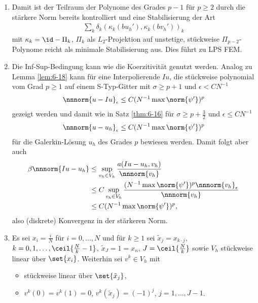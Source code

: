 \begin{bemerkung*}
  \begin{enumerate}
  \item Damit ist der Teilraum der Polynome des Grades $p-1$ für $p \geq 2$ durch die stärkere Norm bereits kontrolliert und eine Stabilisierung der Art
    \begin{align*}
      \sum_{k} \delta_{k} (\kappa_{k}(b u_{h}'), \kappa_{k}(b v_{h}'))_{k}
    \end{align*}
    mit $\kappa_{k} = \id - \Pi_{k}$, $\Pi_{k}$ als $L_{2}$-Projektion auf unstetige, stückweise $\Pi_{p-2}$-Polynome reicht als minimale Stabilisierung aus. Dies führt zu LPS FEM. 
  \item Die Inf-Sup-Bedingung kann wie die Koerzitivität genutzt werden. Analog zu Lemma \ref{lem:6-18} kann für eine Interpolierende $Iu$, die stückweise polynomial vom Grad $p \geq 1$ auf einem S-Typ-Gitter mit $\sigma \geq p + 1$ und $\epsilon < C N^{-1}$
    \begin{align*}
      \nnnorm{u - Iu}_{\epsilon} \leq C (N^{-1} \max \norm{\psi'})^{p}
    \end{align*}
    gezeigt werden und damit wie in Satz \ref{thm:6-16} für $\sigma \geq p+ \frac 32 $ und $\epsilon \leq C N^{-1}$
    \begin{align*}
      \nnnorm{u - u_{h}}_{\epsilon} \leq C (N^{-1} \max \norm{\psi'})^{p}
    \end{align*}
    für die Galerkin-Lösung $u_{h}$ des Grades $p$ bewiesen werden. 
Damit folgt aber auch
\begin{align*}
  \beta \nnnorm{Iu - u_{h}} &\leq  \sup_{v_{h} \in V_{h}} \frac{a(Iu - u_{h}, v_{h})} {\nnnorm {v_{h}}}\\
  & \leq C \sup_{v_{h} \in V_{h}} \frac{(N^{-1} \max \norm{\psi'})^{p} \nnnorm{v_{h}}_{\epsilon}} {\nnnorm {v_{h}}}\\
  & \leq C (N^{-1} \max \norm{\psi'})^{p}, 
\end{align*}
also (diskrete) Konvergenz in der stärkeren Norm. 
\item Es sei $x_{i} = \frac i N$ für $i = 0, \dots, N$ und für $k \geq 1$ sei $\tilde x_{j} = x_{k \cdot j}$, $k = 0, 1, \dots, \ceil{\frac Nk - 1}$, $\tilde x_{J} = 1 = x_{n}$, $J = \ceil{\frac N k}$ sowie $V_{h}$ stückweise linear über $\set{x_{i}}$. Weiterhin sei $v^{k} \in V_{h}$ mit
  \begin{itemize}
  \item stückweise linear über $\set{\tilde x_{j}}$, \\
  \item $v^{k}(0) = v^{k}(1) = 0$, $v^{k}(\tilde x_{j}) = (-1)^{j}$, $j = 1, \dots, J-1$. 

\end{itemize}
\end{enumerate}
\end{bemerkung*}
